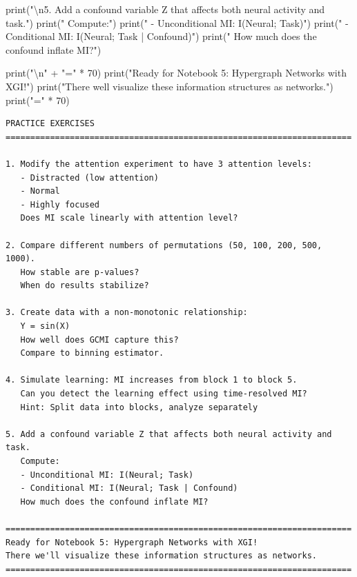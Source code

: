 \documentclass[
  11pt,
  letterpaper,
  oneside,
  openany]{book}
\newenvironment{Shaded}{\begin{snugshade}}{\end{snugshade}}
\newcommand{\BuiltInTok}[1]{\textcolor[rgb]{0.00,0.23,0.31}{#1}}
\newcommand{\CharTok}[1]{\textcolor[rgb]{0.13,0.47,0.30}{#1}}
\newcommand{\DecValTok}[1]{\textcolor[rgb]{0.68,0.00,0.00}{#1}}
\newcommand{\NormalTok}[1]{\textcolor[rgb]{0.00,0.23,0.31}{#1}}
\newcommand{\OperatorTok}[1]{\textcolor[rgb]{0.37,0.37,0.37}{#1}}
\newcommand{\StringTok}[1]{\textcolor[rgb]{0.13,0.47,0.30}{#1}}
\begin{document}
\begin{Shaded}
\begin{Highlighting}[]
\BuiltInTok{print}\NormalTok{(}\StringTok{"}\CharTok{\textbackslash{}n}\StringTok{5. Add a confound variable Z that affects both neural activity and task."}\NormalTok{)}
\BuiltInTok{print}\NormalTok{(}\StringTok{"   Compute:"}\NormalTok{)}
\BuiltInTok{print}\NormalTok{(}\StringTok{"   {-} Unconditional MI: I(Neural; Task)"}\NormalTok{)}
\BuiltInTok{print}\NormalTok{(}\StringTok{"   {-} Conditional MI: I(Neural; Task | Confound)"}\NormalTok{)}
\BuiltInTok{print}\NormalTok{(}\StringTok{"   How much does the confound inflate MI?"}\NormalTok{)}

\BuiltInTok{print}\NormalTok{(}\StringTok{"}\CharTok{\textbackslash{}n}\StringTok{"} \OperatorTok{+} \StringTok{"="} \OperatorTok{*} \DecValTok{70}\NormalTok{)}
\BuiltInTok{print}\NormalTok{(}\StringTok{"Ready for Notebook 5: Hypergraph Networks with XGI!"}\NormalTok{)}
\BuiltInTok{print}\NormalTok{(}\StringTok{"There we\textquotesingle{}ll visualize these information structures as networks."}\NormalTok{)}
\BuiltInTok{print}\NormalTok{(}\StringTok{"="} \OperatorTok{*} \DecValTok{70}\NormalTok{)}
\end{Highlighting}
\end{Shaded}

\begin{verbatim}
PRACTICE EXERCISES
======================================================================

1. Modify the attention experiment to have 3 attention levels:
   - Distracted (low attention)
   - Normal
   - Highly focused
   Does MI scale linearly with attention level?

2. Compare different numbers of permutations (50, 100, 200, 500, 1000).
   How stable are p-values?
   When do results stabilize?

3. Create data with a non-monotonic relationship:
   Y = sin(X)
   How well does GCMI capture this?
   Compare to binning estimator.

4. Simulate learning: MI increases from block 1 to block 5.
   Can you detect the learning effect using time-resolved MI?
   Hint: Split data into blocks, analyze separately

5. Add a confound variable Z that affects both neural activity and task.
   Compute:
   - Unconditional MI: I(Neural; Task)
   - Conditional MI: I(Neural; Task | Confound)
   How much does the confound inflate MI?

======================================================================
Ready for Notebook 5: Hypergraph Networks with XGI!
There we'll visualize these information structures as networks.
======================================================================
\end{verbatim}
\end{document}
